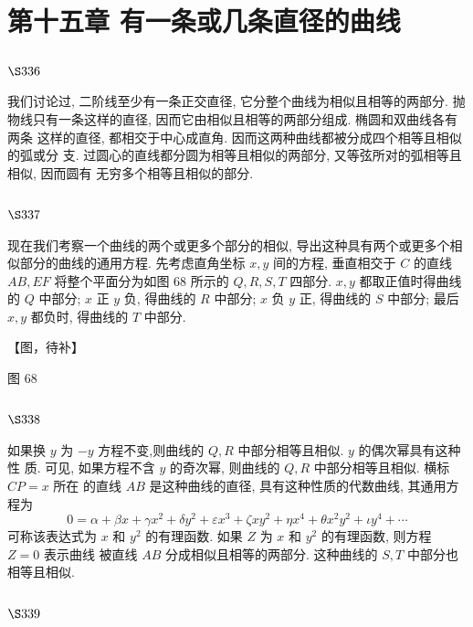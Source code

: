 \chapter{第十五章 有一条或几条直径的曲线}

\section{$\S 336$}

我们讨论过, 二阶线至少有一条正交直径, 它分整个曲线为相似且相等的两部分. 抛 物线只有一条这样的直径, 因而它由相似且相等的两部分组成. 椭圆和双曲线各有两条 这样的直径, 都相交于中心成直角. 因而这两种曲线都被分成四个相等且相似的弧或分 支. 过圆心的直线都分圆为相等且相似的两部分, 又等弦所对的弧相等且相似, 因而圆有 无穷多个相等且相似的部分.

\section{$\S 337$}

现在我们考察一个曲线的两个或更多个部分的相似, 导出这种具有两个或更多个相 似部分的曲线的通用方程. 先考虑直角坐标 $x, y$ 间的方程, 垂直相交于 $C$ 的直线 $A B, E F$ 将整个平面分为如图 68 所示的 $Q, R, S, T$ 四部分. $x, y$ 都取正值时得曲线的 $Q$ 中部分; $x$ 正 $y$ 负, 得曲线的 $R$ 中部分; $x$ 负 $y$ 正, 得曲线的 $S$ 中部分; 最后 $x, y$ 都负时, 得曲线的 $T$ 中部分.


【图，待补】

图 68

\section{$\S 338$}

如果换 $y$ 为 $-y$ 方程不变,则曲线的 $Q, R$ 中部分相等且相似. $y$ 的偶次幂具有这种性 质. 可见, 如果方程不含 $y$ 的奇次幂, 则曲线的 $Q, R$ 中部分相等且相似. 横标 $C P=x$ 所在 的直线 $A B$ 是这种曲线的直径, 具有这种性质的代数曲线, 其通用方程为
\[
0=\alpha+\beta x+\gamma x^{2}+\delta y^{2}+\varepsilon x^{3}+\zeta x y^{2}+\eta x^{4}+\theta x^{2} y^{2}+\iota y^{4}+\cdots
\]
可称该表达式为 $x$ 和 $y^{2}$ 的有理函数. 如果 $Z$ 为 $x$ 和 $y^{2}$ 的有理函数, 则方程 $Z=0$ 表示曲线 被直线 $A B$ 分成相似且相等的两部分. 这种曲线的 $S, T$ 中部分也相等且相似. 

\section{$\S 339$}

